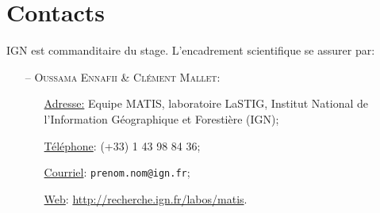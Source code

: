 \documentclass[a4paper,11pt]{article}
\begin{document}
    \section*{Contacts}
    IGN est commanditaire du stage. L'encadrement scientifique se assurer par:
    \begin{itemize}
        \item[--] \textsc{Oussama Ennafii \& Clément Mallet:}
        \begin{itemize}
            \item[\underline{Adresse:}] Equipe MATIS, laboratoire LaSTIG, Institut National de l'Information Géographique et Forestière (IGN);
            \item[\underline{Téléphone}:] (+33) 1 43 98 84 36;
            \item[\underline{Courriel}:] \texttt{prenom.nom@ign.fr};
            \item[\underline{Web}:] \url{http://recherche.ign.fr/labos/matis}.
        \end{itemize}
    \end{itemize}
\end{document}
